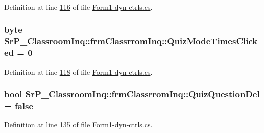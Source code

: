 \-Definition at line \hyperlink{_form1-dyn-ctrls_8cs_source_l00116}{116} of file \hyperlink{_form1-dyn-ctrls_8cs_source}{\-Form1-\/dyn-\/ctrls.\-cs}.

\hypertarget{class_sr_p___classroom_inq_1_1frm_classrrom_inq_a0c88b881dc5ae86b5b3d5e04434b2ea8}{
\subsubsection[{\-Quiz\-Mode\-Times\-Clicked}]{\setlength{\rightskip}{0pt plus 5cm}byte {\bf \-Sr\-P\-\_\-\-Classroom\-Inq\-::frm\-Classrrom\-Inq\-::\-Quiz\-Mode\-Times\-Clicked} = 0}}
\label{class_sr_p___classroom_inq_1_1frm_classrrom_inq_a0c88b881dc5ae86b5b3d5e04434b2ea8}


\-Definition at line \hyperlink{_form1-dyn-ctrls_8cs_source_l00118}{118} of file \hyperlink{_form1-dyn-ctrls_8cs_source}{\-Form1-\/dyn-\/ctrls.\-cs}.

\hypertarget{class_sr_p___classroom_inq_1_1frm_classrrom_inq_aa1c6ba1dda756081aba5b3cfea87b09d}{
\subsubsection[{\-Quiz\-Question\-Del}]{\setlength{\rightskip}{0pt plus 5cm}bool {\bf \-Sr\-P\-\_\-\-Classroom\-Inq\-::frm\-Classrrom\-Inq\-::\-Quiz\-Question\-Del} = false}}
\label{class_sr_p___classroom_inq_1_1frm_classrrom_inq_aa1c6ba1dda756081aba5b3cfea87b09d}


\-Definition at line \hyperlink{_form1-dyn-ctrls_8cs_source_l00135}{135} of file \hyperlink{_form1-dyn-ctrls_8cs_source}{\-Form1-\/dyn-\/ctrls.\-cs}.

